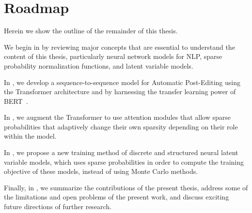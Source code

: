 \section{Roadmap}
\label{sec:int_roadmap}

Herein we show the outline of the remainder of this thesis.

We begin in  by reviewing major concepts
that are essential to understand the content of this thesis,
particularly neural network models for NLP, sparse probability
normalization functions, and latent variable models.

In , we develop a sequence-to-sequence model for
Automatic Post-Editing using the Transformer architecture and by
harnessing the transfer learning power of
BERT~\citep{devlin2018bert}.

In , we augment the Transformer to use
attention modules that allow sparse probabilities that adaptively
change their own sparsity depending on their role within the model.

In , we propose a new training method of
discrete and structured neural latent variable models, which uses
sparse probabilities in order to compute the training objective of
these models, instead of using Monte Carlo methods.

Finally, in , we summarize the
contributions of the present thesis, address some of the limitations
and open problems of the present work, and discuss exciting future
directions of further research.
